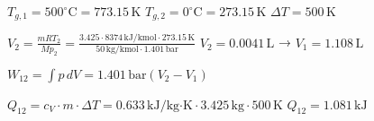\( T_{g,1} = 500^\circ \text{C} = 773.15 \, \text{K} \)  
\( T_{g,2} = 0^\circ \text{C} = 273.15 \, \text{K} \)  
\( \Delta T = 500 \, \text{K} \)  

\( V_2 = \frac{mRT_2}{M p_2} = \frac{3.425 \cdot 8374 \, \text{kJ/kmol} \cdot 273.15 \, \text{K}}{50 \, \text{kg/kmol} \cdot 1.401 \, \text{bar}} \)  
\( V_2 = 0.0041 \, \text{L} \) → \( V_1 = 1.108 \, \text{L} \)  

\( W_{12} = \int p \, dV = 1.401 \, \text{bar} (V_2 - V_1) \)  

\( Q_{12} = c_V \cdot m \cdot \Delta T = 0.633 \, \text{kJ/kg·K} \cdot 3.425 \, \text{kg} \cdot 500 \, \text{K} \)  
\( Q_{12} = 1.081 \, \text{kJ} \)
